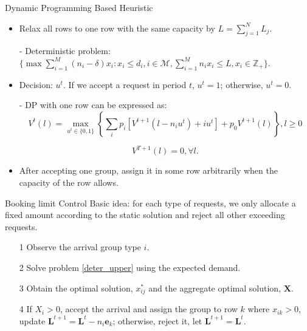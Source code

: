       \begin{frame}{Dynamic Programming Based Heuristic}
        \begin{itemize}
        \item Relax all rows to one row with the same capacity by $L = \sum_{j=1}^{N} L_j$.
        \item[-] Deterministic problem: $\{\max \sum_{i=1}^{M} (n_i- \delta) x_{i}: x_{i} \leq d_{i}, i \in \mathcal{M}, \sum_{i=1}^{M} n_{i} x_{i} \leq L, x_{i} \in \mathbb{Z}_{+}\}$.
        \item Decision: $u^{t}$. If we accept a request in period $t$, $u^t = 1$; otherwise, $u^t =0$.  
        \item[-] DP with one row can be expressed as:
        $$V^{t}(l) =  \max_{u^{t} \in \{0,1\}} \left\{ \sum_{i} p_i [V^{t+1}(l-n_i u^{t})+ i u^{t}] + p_0 V^{t+1}(l)\right\}, l \geq 0 $$

        $$V^{T+1}(l) =0, \forall l.$$
        \item After accepting one group, assign it in some row arbitrarily when the capacity of the row allows.
        \end{itemize}
      \end{frame}
      
      \begin{frame}{Booking limit Control}
        Basic idea: for each type of requests, we only allocate a fixed amount according to the static solution and reject all other exceeding requests.
        \begin{itemize}
          \item[1] Observe the arrival group type $i$.
          \item[2] Solve problem \eqref{deter_upper} using the expected demand.
          \item[3] Obtain the optimal solution, $x_{ij}^{*}$ and the aggregate optimal solution, $\mathbf{X}$.
          \item[4] If $X_{i} > 0$, accept the arrival and assign the group to row $k$ where $x_{ik} > 0$, update $\mathbf{L}^{t+1} = \mathbf{L}^{t} - n_i \mathbf{e}_{k}$; otherwise, reject it, let $\mathbf{L}^{t+1} = \mathbf{L}^{t}$.
        \end{itemize}
                 
      \end{frame}